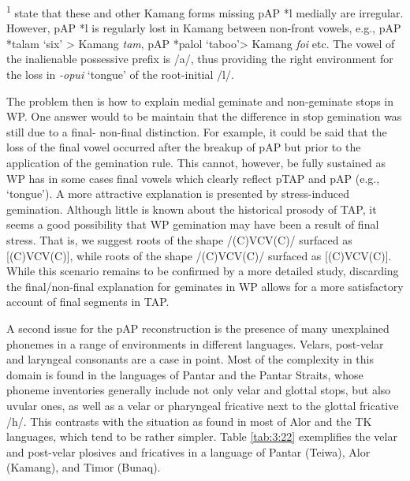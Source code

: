 \begin{sidewaystable}
\textsuperscript{1} \citet{HoltonEtAl2012} state that these and other Kamang forms missing pAP *l medially are irregular. However, pAP *l is regularly lost in Kamang between non-front vowels, e.g., pAP *talam `six' {\textgreater} Kamang \textit{ta{\textlengthmark}m}, pAP *palol `taboo'{\textgreater} Kamang \textit{fo{\textlengthmark}i} etc. The vowel of the inalienable possessive prefix is /a/, thus providing the right environment for the loss in \textit{{}-opui} `tongue' of the root-initial /l/.  
\end{sidewaystable}


The problem then is how to explain medial geminate and non-geminate stops in WP. One answer would to be maintain that the difference in stop gemination was still due to a final- non-final distinction. For example, it could be said that the loss of the final vowel occurred after the breakup of pAP but prior to the application of the gemination rule. This cannot, however, be fully sustained as WP has in some cases final vowels which clearly reflect pTAP and pAP (e.g., `tongue'). A more attractive explanation is presented by stress-induced gemination. Although little is known about the historical prosody of TAP, it seems a good possibility that WP gemination may have been a result of final stress. That is, we suggest roots of the shape /(C)V{\textprimstress}CV(C)/ surfaced as [(C)V{\textprimstress}C{\textlengthmark}V(C)], while roots of the shape /{\textprimstress}(C)VCV(C)/ surfaced as [{\textprimstress}(C)VCV(C)]. While this scenario remains to be confirmed by a more detailed study, discarding the final/non-final explanation for geminates in WP allows for a more satisfactory account of final segments in TAP.

A second issue for the pAP reconstruction is the presence of many unexplained phonemes in a range of environments in different languages. Velars, post-velar and laryngeal consonants are a case in point. Most of the complexity in this domain is found in the languages of Pantar and the Pantar Straits, whose phoneme inventories generally include not only velar and glottal stops, but also uvular ones, as well as a velar or pharyngeal fricative next to the glottal fricative /h/. This contrasts with the situation as found in most of Alor and the TK languages, which tend to be rather simpler. Table \ref{tab:3:22} exemplifies the velar and post-velar plosives and fricatives in a language of Pantar (Teiwa), Alor (Kamang), and Timor (Bunaq).



